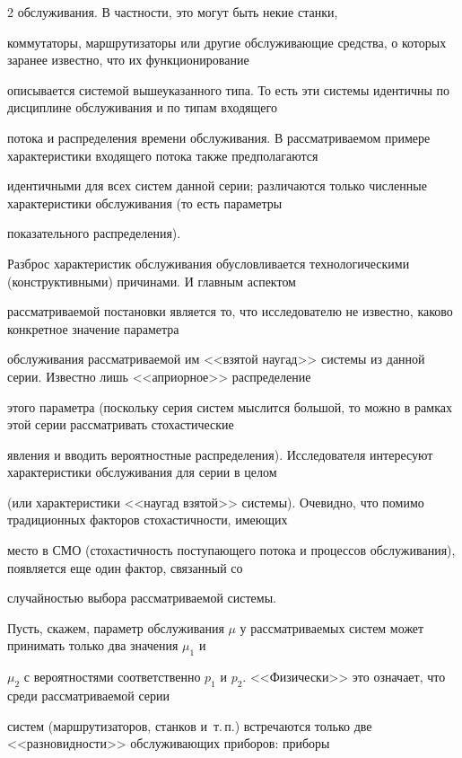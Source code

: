 \begin{multicols}{2}
обслу\-жи\-ва\-ния. В частности, это могут быть некие станки,


коммутаторы, маршрутизаторы или другие обслуживающие средства, о которых заранее известно, что их функционирование


описывается системой вышеуказанного типа. То есть эти сис\-те\-мы идентичны по дисциплине обслуживания и по типам входящего


потока и распределения времени обслуживания. В рассматриваемом примере характеристики входящего потока также предполагаются


идентичными для всех систем данной серии; различаются только численные характеристики обслуживания (то есть параметры


показательного распределения).





Разброс характеристик обслуживания обуслов\-ли\-ва\-ет\-ся технологическими (конструктивными) причинами. И главным аспектом


рассматриваемой постановки является то, что исследователю не известно, каково конкретное значение параметра


обслуживания рассматриваемой им <<взятой наугад>> системы из данной серии. Известно лишь <<априорное>> распределение


этого параметра (поскольку серия систем мыслится большой, то можно в рамках этой серии рассматривать стохастические


явления и вводить вероятностные распределения). Исследователя интересуют характеристики обслуживания для серии в целом


(или характеристики <<наугад взятой>> системы). Очевидно, что помимо традиционных факторов стохастичности, имеющих


место в СМО (стохастичность поступающего потока и процессов обслуживания), появляется еще один фактор, связанный со


случайностью выбора рассматриваемой системы.





Пусть, скажем, параметр обслуживания $\mu$ у рассматриваемых систем может принимать только два значения $\mu_1$ и


$\mu_2$ с вероятностями соответственно $p_1$ и $p_2$. <<Физически>> это означает, что среди рассматриваемой серии


систем (маршрутизаторов, станков и~т.\,п.) встречаются только две <<разновидности>> обслуживающих приборов: приборы



\end{multicols}
